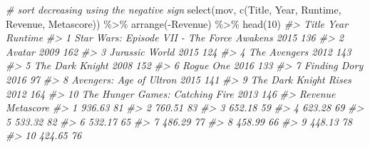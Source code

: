 \documentclass[
]{book}
\newenvironment{Shaded}{\begin{snugshade}}{\end{snugshade}}
\newcommand{\CommentTok}[1]{\textcolor[rgb]{0.56,0.35,0.01}{\textit{#1}}}
\newcommand{\DecValTok}[1]{\textcolor[rgb]{0.00,0.00,0.81}{#1}}
\newcommand{\FunctionTok}[1]{\textcolor[rgb]{0.00,0.00,0.00}{#1}}
\newcommand{\NormalTok}[1]{#1}
\newcommand{\SpecialCharTok}[1]{\textcolor[rgb]{0.00,0.00,0.00}{#1}}
\begin{document}
\begin{Shaded}
\begin{Highlighting}[]
\CommentTok{\# sort decreasing using the negative sign}
\FunctionTok{select}\NormalTok{(mov, }\FunctionTok{c}\NormalTok{(Title, Year, Runtime, Revenue, Metascore)) }\SpecialCharTok{\%\textgreater{}\%}
  \FunctionTok{arrange}\NormalTok{(}\SpecialCharTok{{-}}\NormalTok{Revenue) }\SpecialCharTok{\%\textgreater{}\%}
  \FunctionTok{head}\NormalTok{(}\DecValTok{10}\NormalTok{)}
\CommentTok{\#\textgreater{}                                         Title Year Runtime}
\CommentTok{\#\textgreater{} 1  Star Wars: Episode VII {-} The Force Awakens 2015     136}
\CommentTok{\#\textgreater{} 2                                      Avatar 2009     162}
\CommentTok{\#\textgreater{} 3                              Jurassic World 2015     124}
\CommentTok{\#\textgreater{} 4                                The Avengers 2012     143}
\CommentTok{\#\textgreater{} 5                             The Dark Knight 2008     152}
\CommentTok{\#\textgreater{} 6                                   Rogue One 2016     133}
\CommentTok{\#\textgreater{} 7                                Finding Dory 2016      97}
\CommentTok{\#\textgreater{} 8                     Avengers: Age of Ultron 2015     141}
\CommentTok{\#\textgreater{} 9                       The Dark Knight Rises 2012     164}
\CommentTok{\#\textgreater{} 10            The Hunger Games: Catching Fire 2013     146}
\CommentTok{\#\textgreater{}    Revenue Metascore}
\CommentTok{\#\textgreater{} 1   936.63        81}
\CommentTok{\#\textgreater{} 2   760.51        83}
\CommentTok{\#\textgreater{} 3   652.18        59}
\CommentTok{\#\textgreater{} 4   623.28        69}
\CommentTok{\#\textgreater{} 5   533.32        82}
\CommentTok{\#\textgreater{} 6   532.17        65}
\CommentTok{\#\textgreater{} 7   486.29        77}
\CommentTok{\#\textgreater{} 8   458.99        66}
\CommentTok{\#\textgreater{} 9   448.13        78}
\CommentTok{\#\textgreater{} 10  424.65        76}


\end{Highlighting}
\end{Shaded}
\end{document}
